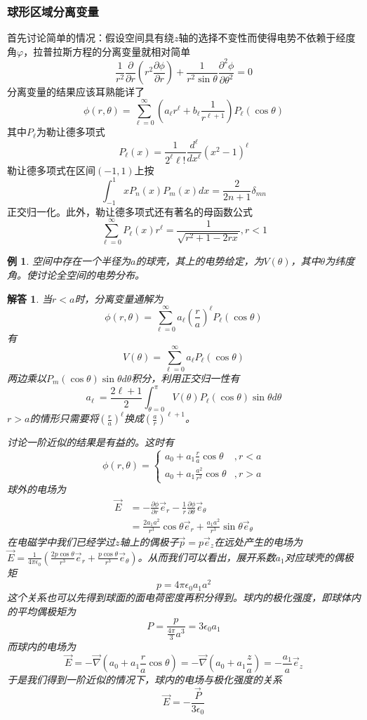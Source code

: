 \documentclass[a4paper,11pt]{ctexart}
\newtheorem{eg}{例}[section]
\newtheorem{ans}{解答}[section]
\newcommand{\beq}{\begin{equation}}
\newcommand{\eeq}{\end{equation}}
\newcommand{\bea}{\begin{equation}\begin{aligned}}
\newcommand{\eea}{\end{aligned}\end{equation}}
\newcommand{\del}{\vec{\nabla}}
\newcommand{\epv}{\epsilon_0}
\newcommand{\pfrac}[2]{\frac{\partial #1}{\partial #2}}
\begin{document}
\subsubsection{球形区域分离变量}
首先讨论简单的情况：假设空间具有绕$z$轴的选择不变性而使得电势不依赖于经度角$\varphi$，拉普拉斯方程的分离变量就相对简单
\beq
\frac{1}{r^2} \pfrac{}{r} (r^2 \pfrac{\phi}{r}) + \frac{1}{r^2\sin \theta} \frac{\partial^2 \phi}{\partial \theta^2} = 0
\eeq
分离变量的结果应该耳熟能详了
\beq
\phi(r,\theta) = \sum_{\ell = 0}^\infty \left(a_\ell r^\ell + b_\ell \frac{1}{r^{\ell + 1}}\right) P_\ell (\cos \theta)
\eeq
其中$P_\ell$为勒让德多项式
\beq
P_\ell (x) = \frac{1}{2^\ell \ell!} \frac{d^\ell}{dx^\ell}(x^2 - 1)^\ell
\eeq
勒让德多项式在区间$(-1,1)$上按
\beq
\int_{-1}^1 x P_n(x) P_m(x) dx = \frac{2}{2n + 1} \delta_{mn}
\eeq
正交归一化。此外，勒让德多项式还有著名的母函数公式
\beq
\sum_{\ell=0}^\infty  P_\ell(x) r^\ell  = \frac{1}{\sqrt{r^2 +1 -2rx}}, r<1
\eeq
\begin{eg}
空间中存在一个半径为$a$的球壳，其上的电势给定，为$V(\theta)$，其中$\theta$为纬度角。使讨论全空间的电势分布。
\end{eg}
\begin{ans}
当$r<a$时，分离变量通解为
\beq
\phi(r,\theta) = \sum_{\ell = 0}^\infty a_\ell \left(\frac{r}{a}\right)^\ell P_\ell (\cos \theta)
\eeq
有
\beq
V(\theta) = \sum_{\ell=0}^\infty a_\ell P_\ell (\cos \theta)
\eeq
两边乘以$P_m(\cos \theta) \sin \theta d \theta$积分，利用正交归一性有
\beq
a_\ell \ =\frac{2\ell + 1}{2} \int_{\theta = 0}^\pi V(\theta) P_\ell(\cos \theta) \sin \theta d\theta
\eeq
$r>a$的情形只需要将$(\frac{r}{a})^\ell$换成$(\frac{a}{r})^{\ell+1}$。
\par
讨论一阶近似的结果是有益的。这时有
\beq
\phi(r,\theta) = 
\begin{cases}
a_0 + a_1 \frac{r}{a} \cos \theta &, r<a \\
a_0 + a_1 \frac{a^2}{r^2} \cos \theta &, r>a
\end{cases}
\eeq
球外的电场为
\bea
\vec{E} &= -\pfrac{\phi}{r} \vec{e}_r - \frac{1}{r} \pfrac{\phi}{\theta} \vec{e}_\theta \\
&= \frac{2a_1 a^2}{r^3} \cos \theta \vec{e}_r + \frac{a_1 a^2}{r^3} \sin \theta \vec{e}_\theta
\eea
在电磁学中我们已经学过$z$轴上的偶极子$\vec{p} = p\vec{e}_z$在远处产生的电场为$\vec{E} = \frac{1}{4\pi \epv} \left( \frac{2p\cos \theta}{r^3} \vec{e}_r + \frac{p\cos \theta}{r^3} \vec{e}_\theta \right) $。从而我们可以看出，展开系数$a_1$对应球壳的偶极矩
\beq
p = 4\pi \epv a_1 a^2
\eeq
这个关系也可以先得到球面的面电荷密度再积分得到。球内的极化强度，即球体内的平均偶极矩为
\beq
P = \frac{p}{\frac{4\pi}{3}a^3} = 3\epv a_1
\eeq
而球内的电场为
\beq
\vec{E} = -\del \left(a_0 + a_1 \frac{r}{a} \cos \theta \right) = -\del \left(a_0 + a_1 \frac{z}{a} \right) = -\frac{a_1}{a} \vec{e}_z
\eeq
于是我们得到一阶近似的情况下，球内的电场与极化强度的关系
\beq
\vec{E} = - \frac{\vec P}{3\epv}
\eeq
\par
\end{ans}
\end{document}
